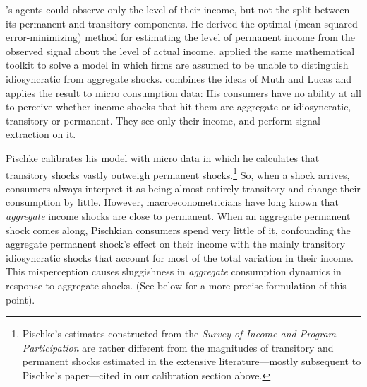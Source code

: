 \documentclass[titlepage]{\econtex}\newcommand{\texname}{cAndCwithStickyE}
\begin{document}
\cite{muthOptimal}'s agents could observe only the level of their income, but not the split between its permanent and transitory components.  He derived the optimal (mean-squared-error-minimizing) method for estimating the level of permanent income from the observed signal about the level of actual income.  \cite{lucas:imperfectInfo} applied the same mathematical toolkit to solve a model in which firms are assumed to be unable to distinguish idiosyncratic from aggregate shocks.  \cite{pischkeMicroMacro} combines the ideas of Muth and Lucas and applies the result to micro consumption data: His consumers have no ability at all to perceive whether income shocks that hit them are aggregate or idiosyncratic, transitory or permanent.  They see only their income, and perform signal extraction on it.

Pischke calibrates his model with micro data in which he calculates that transitory shocks vastly outweigh permanent shocks.\footnote{Pischke's estimates constructed from the {\it Survey of Income and Program Participation} are rather different from the magnitudes of transitory and permanent shocks estimated in the extensive literature---mostly subsequent to Pischke's paper---cited in our calibration section above.}  So, when a shock arrives, consumers always interpret it as being almost entirely transitory and change their consumption by little.  However, macroeconometricians have long known that {\it aggregate} income shocks are close to permanent.  When an aggregate permanent shock comes along, Pischkian consumers spend very little of it, confounding the aggregate permanent shock's effect on their income with the mainly transitory idiosyncratic shocks that account for most of the total variation in their income.  This misperception causes sluggishness in {\it aggregate} consumption dynamics in response to aggregate shocks.  (See below for a more precise formulation of this point).
\end{document}
